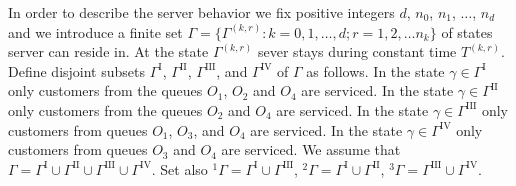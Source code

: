 \documentclass[runningheads,a4paper]{llncs}
\begin{document}
In order to describe the server behavior we fix positive integers $d$, $n_0$, $n_1$, $\ldots$,
$n_d$ and we introduce a finite set $\Gamma=\{\Gamma^{(k,r)} \colon k=0,1,\ldots,d; r=1,2,\ldots
n_k\}$ of states server can reside in. At the state $\Gamma^{(k,r)}$ sever stays during constant time $T^{(k,r)}$. Define disjoint subsets $\Gamma^{\mathrm{I}}$, $\Gamma^{\mathrm{II}}$,
$\Gamma^{\mathrm{III}}$, and $\Gamma^{\mathrm{IV}}$ of $\Gamma$ as follows.  In the state $\gamma
\in \Gamma^{\mathrm{I}}$ only customers from the queues $O_1$, $O_2$ and $O_4$ are serviced. In the
state $\gamma \in \Gamma^{\mathrm{II}}$ only customers from the queues $O_2$ and $O_4$ are serviced.
In the state $\gamma \in \Gamma^{\mathrm{III}}$ only customers from queues $O_1$, $O_3$, and $O_4$
are serviced.  In the state $\gamma \in \Gamma^{\mathrm{IV}}$ only customers from queues $O_3$ and
$O_4$ are serviced.  We assume that $\Gamma = \Gamma^{\mathrm{I}} \cup \Gamma^{\mathrm{II}} \cup
\Gamma^{\mathrm{III}} \cup \Gamma^{\mathrm{IV}}$. Set also ${}^1\Gamma=\Gamma^{\mathrm{I}} \cup
\Gamma^{\mathrm{III}}$, ${}^2\Gamma=\Gamma^{\mathrm{I}} \cup \Gamma^{\mathrm{II}}$,
${}^3\Gamma=\Gamma^{\mathrm{III}} \cup \Gamma^{\mathrm{IV}}$.
\end{document}
